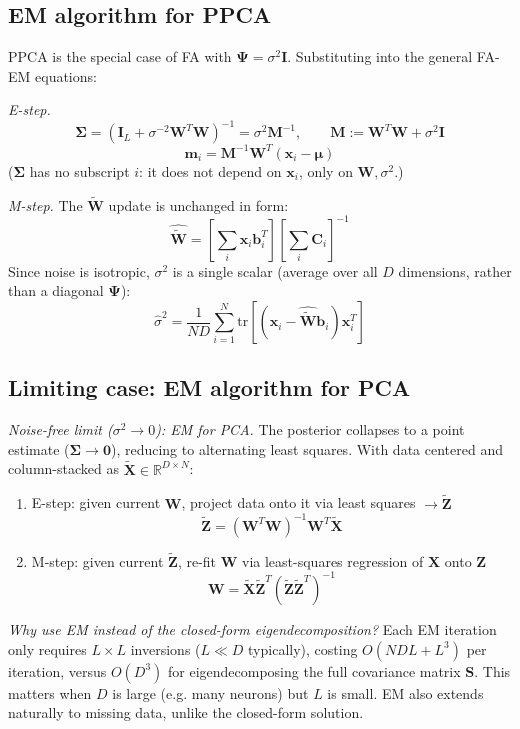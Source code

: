 \documentclass[11pt]{article}
\begin{document}
\subsection{EM algorithm for PPCA}

PPCA is the special case of FA with $\boldsymbol{\Psi} = \sigma^2\mathbf{I}$. Substituting into the general FA-EM equations:

\textit{E-step.}
\[
\boldsymbol{\Sigma} = \left(\mathbf{I}_L + \sigma^{-2}\mathbf{W}^T\mathbf{W}\right)^{-1} = \sigma^2\mathbf{M}^{-1}, \qquad \mathbf{M} := \mathbf{W}^T\mathbf{W}+\sigma^2\mathbf{I}
\]
\[
\mathbf{m}_i = \mathbf{M}^{-1}\mathbf{W}^T(\mathbf{x}_i-\boldsymbol{\mu})
\]
($\boldsymbol{\Sigma}$ has no subscript $i$: it does not depend on $\mathbf{x}_i$, only on $\mathbf{W},\sigma^2$.)

\textit{M-step.} The $\tilde{\mathbf{W}}$ update is unchanged in form:
\[
\hat{\tilde{\mathbf{W}}} = \left[\sum_i \mathbf{x}_i\mathbf{b}_i^T\right]\left[\sum_i \mathbf{C}_i\right]^{-1}
\]
Since noise is isotropic, $\sigma^2$ is a single scalar (average over all $D$ dimensions, rather than a diagonal $\boldsymbol{\Psi}$):
\[
\hat\sigma^2 = \frac{1}{ND}\sum_{i=1}^N \mathrm{tr}\left[(\mathbf{x}_i-\hat{\tilde{\mathbf{W}}}\mathbf{b}_i)\mathbf{x}_i^T\right]
\]

\subsection{Limiting case: EM algorithm for PCA}
\textit{Noise-free limit ($\sigma^2\to0$): EM for PCA.} The posterior collapses to a point estimate ($\boldsymbol{\Sigma}\to\mathbf{0}$), reducing to alternating least squares. With data centered and column-stacked as $\tilde{\mathbf{X}}\in\mathbb{R}^{D\times N}$:
\begin{enumerate}
    \item E-step: given current $\mathbf{W}$, project data onto it via least squares $\to \tilde{\mathbf{Z}}$
    \[
    \tilde{\mathbf{Z}} = (\mathbf{W}^T\mathbf{W})^{-1}\mathbf{W}^T\tilde{\mathbf{X}}
    \]
    \item M-step: given current $\tilde{\mathbf{Z}}$, re-fit $\mathbf{W}$ via least-squares regression of $\mathbf{X}$ onto $\mathbf{Z}$
    \[
    \mathbf{W} = \tilde{\mathbf{X}}\tilde{\mathbf{Z}}^T(\tilde{\mathbf{Z}}\tilde{\mathbf{Z}}^T)^{-1}
    \]
\end{enumerate}

\textit{Why use EM instead of the closed-form eigendecomposition?} Each EM iteration only requires $L\times L$ inversions ($L\ll D$ typically), costing $O(NDL+L^3)$ per iteration, versus $O(D^3)$ for eigendecomposing the full covariance matrix $\mathbf{S}$. This matters when $D$ is large (e.g. many neurons) but $L$ is small. EM also extends naturally to missing data, unlike the closed-form solution.
\end{document}
